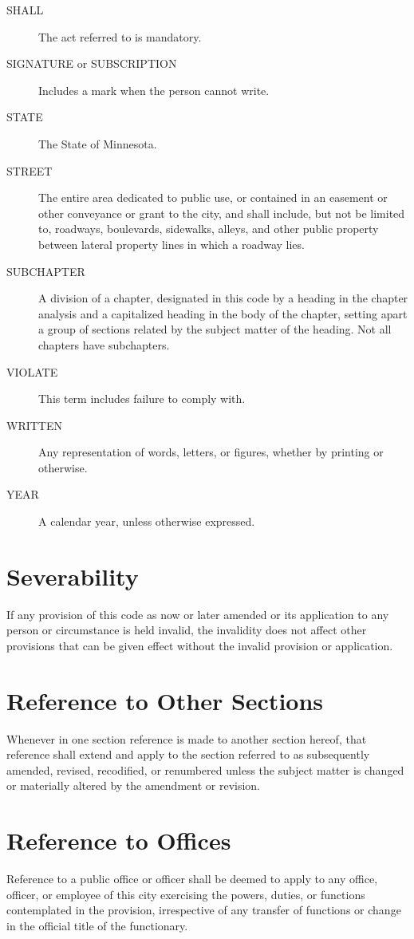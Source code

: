 \begin{description}
\item[SHALL] The act referred to is mandatory.
\item[SIGNATURE or SUBSCRIPTION] Includes a mark when the person cannot write.
\item[STATE] The State of Minnesota.
\item[STREET] The entire area dedicated to public use, or contained in an easement or other conveyance or grant to the city, and shall include, but not be limited to, roadways, boulevards, sidewalks, alleys, and other public property between lateral property lines in which a roadway lies.
\item[SUBCHAPTER] A division of a chapter, designated in this code by a heading in the chapter analysis and a capitalized heading in the body of the chapter, setting apart a group of sections related by the subject matter of the heading.  Not all chapters have subchapters.
\item[VIOLATE] This term includes failure to comply with.
\item[WRITTEN] Any representation of words, letters, or figures, whether by printing or otherwise.
\item[YEAR] A calendar year, unless otherwise expressed.
\end{description}



\section{Severability}
If any provision of this code as now or later amended or its application to any person or circumstance is held invalid, the invalidity does not affect other provisions that can be given effect without the invalid provision or application.



\section{Reference to Other Sections}
Whenever in one section reference is made to another section hereof, that reference shall extend and apply to the section referred to as subsequently amended, revised, recodified, or renumbered unless the subject matter is changed or materially altered by the amendment or revision.



\section{Reference to Offices}
Reference to a public office or officer shall be deemed to apply to any office, officer, or employee of this city exercising the powers, duties, or functions contemplated in the provision, irrespective of any transfer of functions or change in the official title of the functionary.



